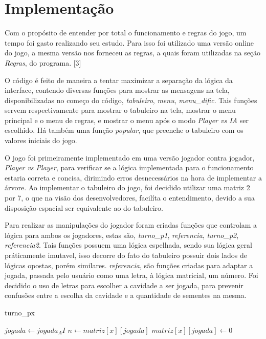 \documentclass[a4paper, 12pt]{article}
\begin{document}
		
	\section{Implementação}
		\textrm{Com o propósito de entender por total o funcionamento e regras do jogo, um tempo foi gasto realizando seu estudo. Para isso foi utilizado uma versão online do jogo, a mesma versão nos forneceu as regras, a quais foram utilizadas na seção \emph{Regras}, do programa. [3]}
		
		\textrm{O código é feito de maneira a tentar maximizar a separação da lógica da interface, contendo diversas funções para mostrar as mensagens na tela, disponibilizadas no começo do código, \emph{tabuleiro}, \emph{menu}, \emph{menu_dific}. Tais funções servem respectivamente para mostrar o tabuleiro na tela, mostrar o menu principal e o menu de regras, e mostrar o menu após o modo \emph{Player vs IA} ser escolhido. Há também uma função \emph{popular}, que preenche o tabuleiro com os valores iniciais do jogo.}
		
		\textrm{O jogo foi primeiramente implementado em uma versão jogador contra jogador, \emph{Player vs Player}, para verificar se a lógica implementada para o funcionamento estaria correta e concisa, dirimindo erros desnecessários na hora de implementar a árvore. Ao implementar o tabuleiro do jogo, foi decidido utilizar uma matriz 2 por 7, o que na visão dos desenvolvedores, facilíta o entendimento, devido a sua disposição espacial ser equivalente ao do tabuleiro.}
		
		\textrm{Para realizar as manipulações do jogador foram criadas funções que controlam a lógica para ambos os jogadores, estas são, \emph{turno_p1}, \emph{referencia}, \emph{turno_p2}, \emph{referencia2}. Tais funções possuem uma lógica espelhada, sendo sua lógica geral práticamente imutavel, isso decorre do fato do tabuleiro possuir dois lados de lógicas opostas, porém similares. \emph{referencia}, são funções criadas para adaptar a jogada, passada pelo usuário como uma letra, à lógica matricial, um número. Foi decidido o uso de letras para escolher a cavidade a ser jogada, para prevenir confusões entre a escolha da cavidade e a quantidade de sementes na mesma.}
		
		\begin{algorithm}
		\caption{turno_px}\label{euclid}
		\begin{algorithmic}[1]
			\Else
				\State $jogada \gets jogada_AI$
			\Endif
			\State $n \gets matriz[x][jogada]$
			\State $matriz[x][jogada] \gets 0$
			\EndWhile
			\EndIf
			\EndIf
		\EndProcedure
		\end{algorithmic}
		\end{algorithm}
		
\end{document}
